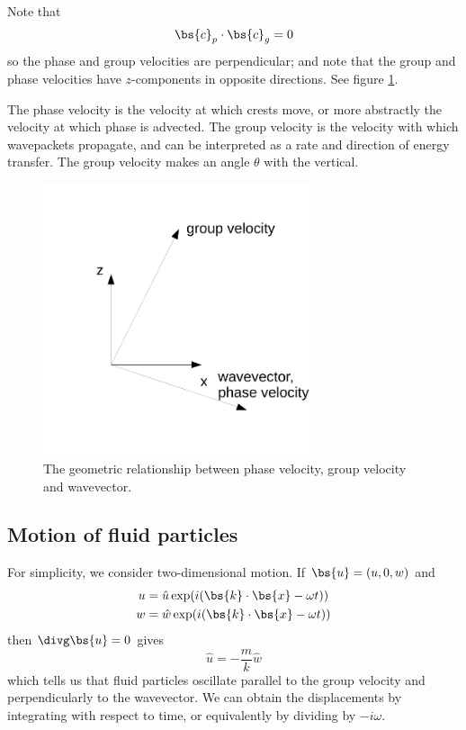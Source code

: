 Note that 
\begin{equation}
	\bs{c}_p\cdot\bs{c}_g = 0
\end{equation}
so the phase and group velocities are perpendicular; and note that the group and phase velocities have $z$-components in opposite directions. See figure \ref{fig:igw-wave-vels}.

The phase velocity is the velocity at which crests move, or more abstractly the velocity at which phase is advected. The group velocity is the velocity with which wavepackets propagate, and can be interpreted as a rate and direction of energy transfer. The group velocity makes an angle $\theta$ with the vertical. 

\begin{figure}
\begin{center}
	\includegraphics[width=8cm]{igw-wave-vels.pdf}
	\caption{The geometric relationship between phase velocity, group velocity and wavevector.}
	\label{fig:igw-wave-vels}
\end{center}
\end{figure}

\subsection{Motion of fluid particles}

For simplicity, we consider two-dimensional motion. If $\bs{u} = (u,0,w)$ and 
\begin{align}
	u&=\hat{u} \exp(i(\bs{k}\cdot\bs{x} - \omega t)) \\
	w&=\hat{w} \exp(i(\bs{k}\cdot\bs{x} - \omega t)) \\
\end{align}
then $\divg\bs{u}=0$ gives
\begin{equation}
	\hat{u} = -\frac{m}{k}\hat{w}
\end{equation}
which tells us that fluid particles oscillate parallel to the group velocity and perpendicularly to the wavevector. We can obtain the displacements by integrating with respect to time, or equivalently by dividing by $-i\omega$. 

